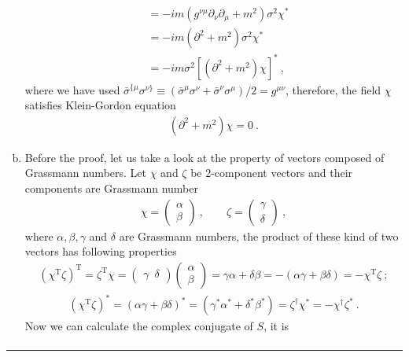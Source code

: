 \documentclass[12pt]{report}
\numberwithin{problemname}{chapter}
\newenvironment{solution}{\vspace{1em}\par\noindent{\large\textbf{\textsc{Solution}}}\par}{\vspace{1em}\hrule}
\begin{document}
\begin{solution}
\begin{enumerate}[(a)]
\begin{align}
        &=-im(g^{\nu\mu}\partial_{\nu}\partial_{\mu}+m^2)\sigma^2\chi^* \nonumber \\
        &=-im(\partial^2+m^2)\sigma^2\chi^* \nonumber \\
        &=-im\sigma^2[(\partial^2+m^2)\chi]^* \ ,
    \end{align}
    where we have used $\bar{\sigma}^{\{\mu}\sigma^{\nu\}}\equiv(\bar{\sigma}^{\mu}\sigma^{\nu}+\bar{\sigma}^{\nu}\sigma^{\mu})/2=g^{\mu\nu}$, therefore, the field $\chi$ satisfies Klein-Gordon equation
    \begin{align}
        (\partial^2+m^2)\chi=0 \ .
    \end{align}
    \item Before the proof, let us take a look at the property of vectors composed of Grassmann numbers. Let $\chi$ and $\zeta$ be 2-component vectors and their components are Grassmann number
    \begin{align}
        \chi=
        \begin{pmatrix}
          \alpha \\
          \beta
        \end{pmatrix}\ ,\quad\quad
        \zeta=
        \begin{pmatrix}
          \gamma \\
          \delta
        \end{pmatrix}\ ,
    \end{align}
    where $\alpha ,\beta ,\gamma$ and $\delta$ are Grassmann numbers, the product of these kind of two vectors has following properties
    \begin{align}
        (\chi^{\text{T}}\zeta)^{\text{T}}=\zeta^{\text{T}}\chi=
        \begin{pmatrix}
          \gamma\enspace\delta
        \end{pmatrix}
        \begin{pmatrix}
          \alpha \\
          \beta
        \end{pmatrix}
        =\gamma\alpha+\delta\beta=-(\alpha\gamma+\beta\delta)=-\chi^{\text{T}}\zeta\ ;
    \end{align}
    \begin{align}
        (\chi^{\text{T}}\zeta)^{*}=(\alpha\gamma+\beta\delta)^{*}=(\gamma^*\alpha^*+\delta^*\beta^*)=\zeta^{\dagger}\chi^*=-\chi^{\dagger}\zeta^* \ .
    \end{align}
    Now we can calculate the complex conjugate of $S$, it is
    \begin{align}

\end{align}
\end{enumerate}
\end{solution}
\end{document}
